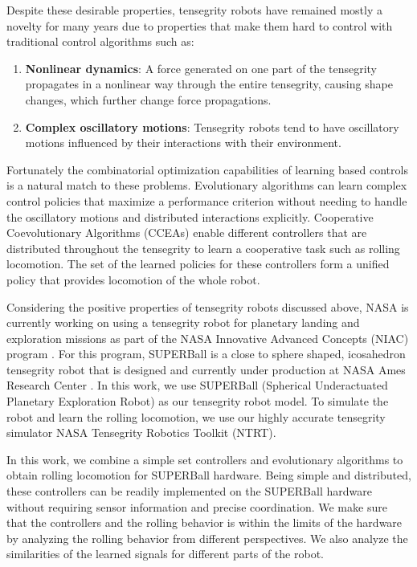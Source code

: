 \documentclass[twocolumn,10pt]{asme2ej}
\begin{document}
Despite these desirable properties, tensegrity robots have remained mostly a novelty for many years due to properties that make them hard to control with traditional control algorithms such as:
\begin{enumerate}
\item {\bf Nonlinear dynamics}: A force generated on one part of the tensegrity propagates in a nonlinear way through the entire tensegrity, causing shape changes, which further change force propagations. 
\item {\bf Complex oscillatory motions}: Tensegrity robots tend to have oscillatory motions influenced by their interactions with their environment.
\end{enumerate}
Fortunately the combinatorial optimization capabilities of learning based controls is a natural match to these problems. Evolutionary algorithms can learn complex control policies that maximize a performance criterion without needing to handle the oscillatory motions and distributed interactions explicitly. Cooperative Coevolutionary Algorithms (CCEAs) enable different controllers that are distributed throughout the tensegrity to learn a cooperative task such as rolling locomotion. The set of the learned policies for these controllers form a unified policy that provides locomotion of the whole robot.

Considering the positive properties of tensegrity robots discussed above, NASA is currently working on using a tensegrity robot for planetary landing and exploration missions as part of the NASA Innovative Advanced Concepts (NIAC) program \cite{NIACfinalreport}. For this program, SUPERBall is a  close to sphere shaped, icosahedron tensegrity robot that is designed and currently under production at NASA Ames Research Center \cite{NIACfinalreport}.  In this work, we use SUPERBall (Spherical Underactuated Planetary Exploration Robot) as our tensegrity robot model. To simulate the robot and learn the rolling locomotion, we use our highly accurate tensegrity simulator NASA Tensegrity Robotics Toolkit (NTRT).

In this work, we combine a simple set controllers and evolutionary algorithms  to obtain rolling locomotion for SUPERBall hardware. Being simple and distributed, these controllers can be readily implemented on the SUPERBall hardware without requiring sensor information and precise coordination. We make sure that the controllers and the rolling behavior is within the limits of the hardware by analyzing the rolling behavior from different perspectives. We also analyze the similarities of the learned signals for different parts of the robot.
\end{document}
